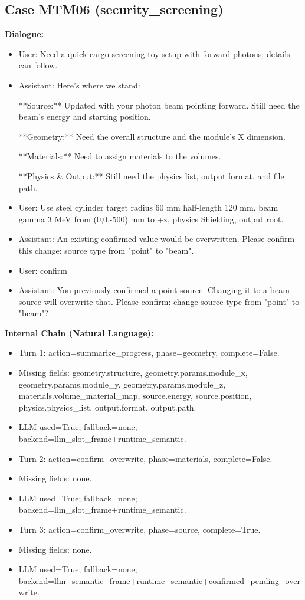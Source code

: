 \documentclass[11pt]{ctexart}
\begin{document}
\subsection{Case MTM06 (security\_screening)}
\textbf{Dialogue:}
\begin{itemize}
\item User: Need a quick cargo-screening toy setup with forward photons; details can follow.
\item Assistant: Here's where we stand:

**Source:** Updated with your photon beam pointing forward. Still need the beam's energy and starting position.

**Geometry:** Need the overall structure and the module's X dimension.

**Materials:** Need to assign materials to the volumes.

**Physics \& Output:** Still need the physics list, output format, and file path.
\item User: Use steel cylinder target radius 60 mm half-length 120 mm, beam gamma 3 MeV from (0,0,-500) mm to +z, physics Shielding, output root.
\item Assistant: An existing confirmed value would be overwritten. Please confirm this change: source type from "point" to "beam".
\item User: confirm
\item Assistant: You previously confirmed a point source. Changing it to a beam source will overwrite that. Please confirm: change source type from "point" to "beam"?
\end{itemize}
\textbf{Internal Chain (Natural Language):}
\begin{itemize}
\item Turn 1: action=summarize\_progress, phase=geometry, complete=False.
\item Missing fields: geometry.structure, geometry.params.module\_x, geometry.params.module\_y, geometry.params.module\_z, materials.volume\_material\_map, source.energy, source.position, physics.physics\_list, output.format, output.path.
\item LLM used=True; fallback=none; backend=llm\_slot\_frame+runtime\_semantic.
\item Turn 2: action=confirm\_overwrite, phase=materials, complete=False.
\item Missing fields: none.
\item LLM used=True; fallback=none; backend=llm\_slot\_frame+runtime\_semantic.
\item Turn 3: action=confirm\_overwrite, phase=source, complete=True.
\item Missing fields: none.
\item LLM used=True; fallback=none; backend=llm\_semantic\_frame+runtime\_semantic+confirmed\_pending\_overwrite.
\end{itemize}
\end{document}
